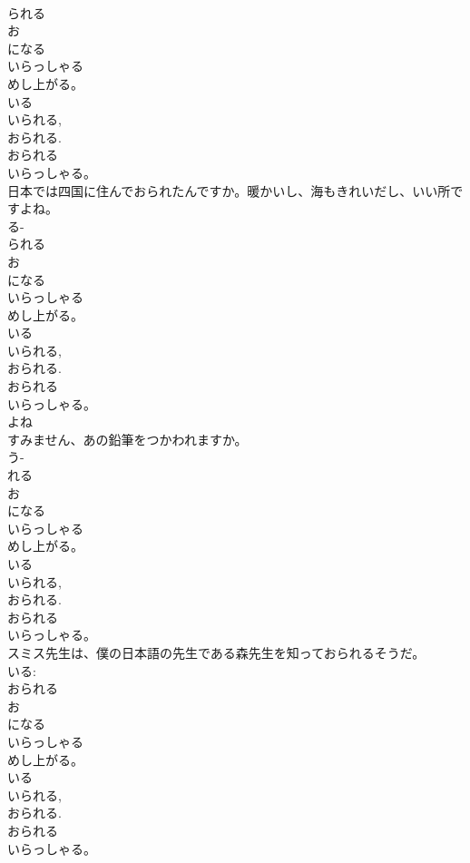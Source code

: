 \documentclass[8pt]{extreport}
\begin{document}
\begin{CJK}{UTF8}{min}
{\\	られる 
\\	お
\\	になる 
\\	いらっしゃる 
\\	めし上がる。 
\\	いる 
\\	いられる, 
\\	おられる. 
\\	おられる 
\\	いらっしゃる。
\\	日本では四国に住んでおられたんですか。暖かいし、海もきれいだし、いい所ですよね。	
\\	る-
\\	られる 
\\	お
\\	になる 
\\	いらっしゃる 
\\	めし上がる。 
\\	いる 
\\	いられる, 
\\	おられる. 
\\	おられる 
\\	いらっしゃる。 
\\	よね 
\\	すみません、あの鉛筆をつかわれますか。	
\\	う-
\\	れる 
\\	お
\\	になる 
\\	いらっしゃる 
\\	めし上がる。 
\\	いる 
\\	いられる, 
\\	おられる. 
\\	おられる 
\\	いらっしゃる。
\\	スミス先生は、僕の日本語の先生である森先生を知っておられるそうだ。	
\\	いる: 
\\	おられる 
\\	お
\\	になる 
\\	いらっしゃる 
\\	めし上がる。 
\\	いる 
\\	いられる, 
\\	おられる. 
\\	おられる 
\\	いらっしゃる。
}
\end{CJK}
\end{document}
